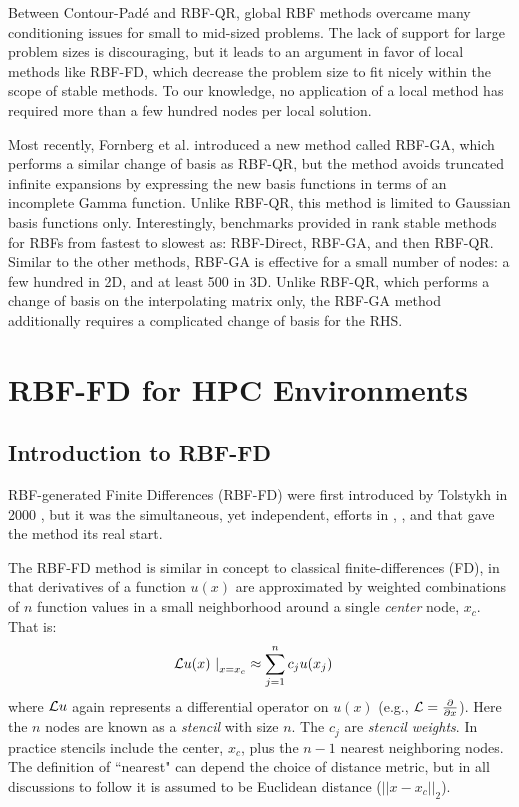 \documentclass[11pt]{report}
\begin{document}
{Between Contour-Pad\'{e} and RBF-QR, global RBF methods overcame many conditioning issues for small to mid-sized problems. The lack of support for large problem sizes is discouraging, but it leads to an argument in favor of local methods like RBF-FD, which decrease the problem size to fit nicely within the scope of stable methods. To our knowledge, no application of a local method has required more than a few hundred nodes per local solution. 

Most recently, Fornberg et al. \cite{Fornberg2012} introduced a new method called RBF-GA, which performs a similar change of basis as RBF-QR, but the method avoids truncated infinite expansions by expressing the new basis functions in terms of an incomplete Gamma function. Unlike RBF-QR, this method is limited to Gaussian basis functions only. Interestingly, benchmarks provided in \cite{Fornberg2012} rank stable methods for RBFs from fastest to slowest as: RBF-Direct, RBF-GA, and then RBF-QR. Similar to the other methods, RBF-GA is effective for a small number of nodes: a few hundred in 2D, and at least 500 in 3D. Unlike RBF-QR, which performs a change of basis on the interpolating matrix only, the RBF-GA method additionally requires a complicated change of basis for the RHS. 




\part{RBF-FD for HPC Environments}

\chapter{Introduction to RBF-FD}
\label{chap:rbffd_method}



RBF-generated Finite Differences (RBF-FD) were first introduced by Tolstykh in 2000 \cite{Tolstykh2000}, 
but it was the simultaneous, yet independent,
efforts in \cite{Shu2003}, \cite{Tolstykh2003a}, \cite{Wright2003} and \cite{Cecil2004} that gave the method its real start. 

The RBF-FD method 
is similar in concept to classical 
finite-differences (FD), in that derivatives of a function $u(x)$ are approximated by weighted combinations of $n$ function values in a small neighborhood around a single \emph{center} node, $x_c$. That is: 
        \begin{align} 
        \left. \mathcal{L}u(x) \ \right|_{x = x_c} &\approx \sum_{j=1}^{n} c_j u(x_j) 
        \label{eq:derivFromFDWeights}
        \end{align}
where $\mathcal{L}u$ again represents a differential operator on $u(x)$ (e.g., $\mathcal{L} = \frac{\partial }{\partial x}$). Here the $n$ nodes are known as a \emph{stencil} with size $n$. The $c_j$ are \emph{stencil weights}. In practice stencils include the center, $x_c$, plus the $n - 1$ nearest neighboring nodes. The definition of ``nearest" can depend the choice of distance metric, but in all discussions to follow it is assumed to be Euclidean distance ($||x-x_c||_2$). 

}
\end{document}
